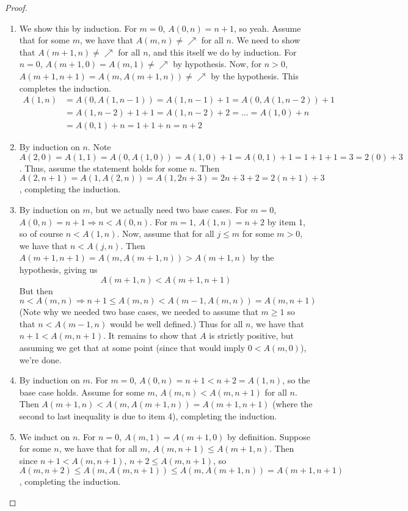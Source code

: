 \documentclass{article}
\theoremstyle{definition}
\theoremstyle{plain}
\theoremstyle{theorem}
\begin{document}
\begin{proof}
    \begin{enumerate}
        \item We show this by induction. For $m=0$, $A(0,n) = n+1$, so yeah. Assume that for some $m$, we have that $A(m,n) \neq \nearrow$ for all $n$. We need to show that $A(m+1,n) \neq \nearrow$ for all $n$, and this itself we do by induction. For $n=0$, $A(m+1,0) = A(m,1) \neq \nearrow$ by hypothesis. Now, for $n>0$, $A(m+1,n+1) = A(m,A(m+1,n)) \neq \nearrow$ by the hypothesis. This completes the induction.
        \begin{align}
        A(1,n) &= A(0,A(1,n-1)) = A(1,n-1)+1 = A(0,A(1,n-2))+1 \\
               &= A(1,n-2)+1+1 = A(1,n-2)+2 = ... = A(1,0)+n \\
               &= A(0,1) + n = 1+1+n = n+2
        \end{align}
        \item By induction on $n$. Note $A(2,0) = A(1,1) = A(0,A(1,0)) = A(1,0)+1 = A(0,1)+1 = 1+1+1 = 3 = 2(0)+3$. Thus, assume the statement holds for some $n$. Then $A(2,n+1) = A(1,A(2,n)) = A(1,2n+3) = 2n+3+2 = 2(n+1)+3$, completing the induction.
        \item By induction on $m$, but we actually need two base cases. For $m=0$, $A(0,n)=n+1 \Rightarrow n < A(0,n)$. For $m=1$, $A(1,n) = n+2$ by item $1$, so of course $n < A(1,n)$. Now, assume that for all $j \leq m$ for some $m > 0$, we have that $n < A(j,n)$. Then $A(m+1,n+1) = A(m,A(m+1,n)) > A(m+1,n)$ by the hypothesis, giving us 
        \[ A(m+1,n) < A(m+1,n+1) \]
        But then
        \[ n < A(m,n) \Rightarrow n+1 \leq A(m,n) < A(m-1,A(m,n)) = A(m,n+1) \]
        (Note why we needed two base cases, we needed to assume that $m \geq 1$ so that $n < A(m-1,n)$ would be well defined.) Thus for all $n$, we have that $n+1 < A(m,n+1)$. It remains to show that $A$ is strictly positive, but assuming we get that at some point (since that would imply $0 < A(m,0)$), we're done.
        \item By induction on $m$. For $m=0$, $A(0,n) = n+1 < n+2 = A(1,n)$, so the base case holds. Assume for some $m$, $A(m,n) < A(m,n+1)$ for all $n$. Then $A(m+1,n) < A(m,A(m+1,n)) = A(m+1,n+1)$ (where the second to last inequality is due to item $4$), completing the induction.
        \item We induct on $n$. For $n=0$, $A(m,1) = A(m+1,0)$ by definition. Suppose for some $n$, we have that for all $m$, $A(m,n+1) \leq A(m+1,n)$. Then since $n+1 < A(m,n+1)$, $n+2 \leq A(m,n+1)$, so $A(m,n+2) \leq A(m,A(m,n+1)) \leq A(m,A(m+1,n))=A(m+1,n+1)$, completing the induction.

\end{enumerate}
\end{proof}
\end{document}
